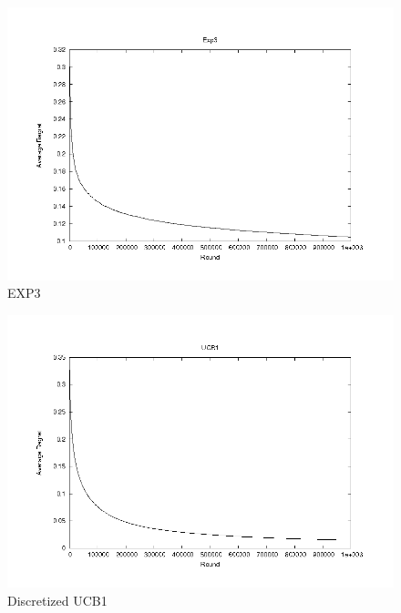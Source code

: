 \documentclass{article}
\begin{document}
\begin{figure}[htb]
  \begin{center}
     \includegraphics[width=\figwidth]{images/exp3.png}
     \caption{EXP3}
     \label{fig:exp3}
  \end{center}
\end{figure}

\begin{figure}[htb]
  \begin{center}
     \includegraphics[width=\figwidth]{images/ucb1.png}
     \caption{Discretized UCB1}
     \label{fig:ucb1}
  \end{center}
\end{figure}
\end{document}

